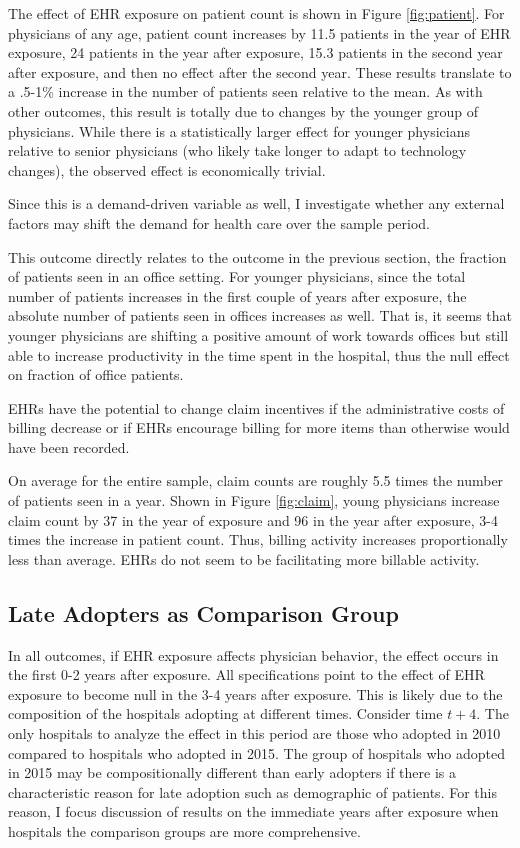 \documentclass[11pt]{article}
\begin{document}
The effect of EHR exposure on patient count is shown in Figure \ref{fig:patient}. For physicians of any age, patient count increases by 11.5 patients in the year of EHR exposure, 24 patients in the year after exposure, 15.3 patients in the second year after exposure, and then no effect after the second year. These results translate to a .5-1\% increase in the number of patients seen relative to the mean. As with other outcomes, this result is totally due to changes by the younger group of physicians. While there is a statistically larger effect for younger physicians relative to senior physicians (who likely take longer to adapt to technology changes), the observed effect is economically trivial. 

Since this is a demand-driven variable as well, I investigate whether any external factors may shift the demand for health care over the sample period. 

This outcome directly relates to the outcome in the previous section, the fraction of patients seen in an office setting. For younger physicians, since the total number of patients increases in the first couple of years after exposure, the absolute number of patients seen in offices increases as well. That is, it seems that younger physicians are shifting a positive amount of work towards offices but still able to increase productivity in the time spent in the hospital, thus the null effect on fraction of office patients. 

EHRs have the potential to change claim incentives if the administrative costs of billing decrease or if EHRs encourage billing for more items than otherwise would have been recorded. 

On average for the entire sample, claim counts are roughly 5.5 times the number of patients seen in a year. Shown in Figure \ref{fig:claim}, young physicians increase claim count by 37 in the year of exposure and 96 in the year after exposure, 3-4 times the increase in patient count. Thus, billing activity increases proportionally less than average. EHRs do not seem to be facilitating more billable activity. 


\subsection{Late Adopters as Comparison Group}

In all outcomes, if EHR exposure affects physician behavior, the effect occurs in the first 0-2 years after exposure. All specifications point to the effect of EHR exposure to become null in the 3-4 years after exposure. This is likely due to the composition of the hospitals adopting at different times. Consider time $t+4$. The only hospitals to analyze the effect in this period are those who adopted in 2010 compared to hospitals who adopted in 2015. The group of hospitals who adopted in 2015 may be compositionally different than early adopters if there is a characteristic reason for late adoption such as demographic of patients. For this reason, I focus discussion of results on the immediate years after exposure when hospitals the comparison groups are more comprehensive. 
\end{document}
